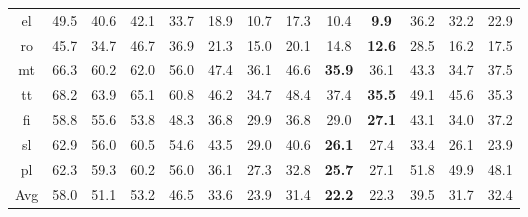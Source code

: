 \begin{table}[h!]
\begin{center}
\begin{tabular}{@{}ccccccccccccc@{}}
el & 49.5         & 40.6        & 42.1          & 33.7        & 18.9            & 10.7           & 17.3    & 10.4          & \textbf{9.9}  & 36.2       & 32.2      & 22.9      \\
ro & 45.7         & 34.7        & 46.7          & 36.9        & 21.3            & 15.0           & 20.1    & 14.8          & \textbf{12.6} & 28.5       & 16.2      & 17.5      \\
mt & 66.3         & 60.2        & 62.0          & 56.0        & 47.4            & 36.1           & 46.6    & \textbf{35.9} & 36.1          & 43.3       & 34.7      & 37.5      \\
tt & 68.2         & 63.9        & 65.1          & 60.8        & 46.2            & 34.7           & 48.4    & 37.4          & \textbf{35.5} & 49.1       & 45.6      & 35.3      \\
fi & 58.8         & 55.6        & 53.8          & 48.3        & 36.8            & 29.9           & 36.8    & 29.0          & \textbf{27.1} & 43.1       & 34.0      & 37.2      \\
sl & 62.9         & 56.0        & 60.5          & 54.6        & 43.5            & 29.0           & 40.6    & \textbf{26.1} & 27.4          & 33.4       & 26.1      & 23.9      \\
pl & 62.3         & 59.3        & 60.2          & 56.0        & 36.1            & 27.3           & 32.8    & \textbf{25.7} & 27.1          & 51.8       & 49.9      & 48.1       \\
\midrule
Avg & 58.0 &	51.1&	53.2&	46.5&	33.6&	23.9&	31.4&	\textbf{22.2}&	22.3&	39.5&	31.7&	32.4
\\
\bottomrule
\end{tabular}
\end{center}
\end{table}